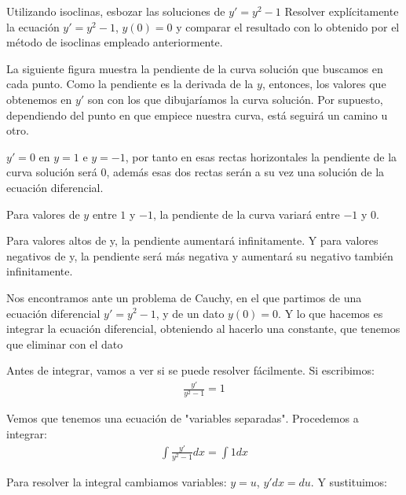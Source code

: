 \documentclass[nochap]{apuntes}
\begin{document}
\begin{problem}[4]
\ppart Utilizando isoclinas, esbozar las soluciones de $y'=y^2-1$
\ppart Resolver explícitamente la ecuación $y'=y^2-1$, $y(0)=0$ y comparar el resultado con lo obtenido por el método de isoclinas empleado anteriormente.

\solution



\spart
\begin{expla}
La siguiente figura muestra la pendiente de la curva solución que buscamos en cada punto. Como la pendiente es la derivada de la $y$, entonces, los valores que obtenemos en $y'$ son con los que dibujaríamos la curva solución. Por supuesto, dependiendo del punto en que empiece nuestra curva, está seguirá un camino u otro.

\end{expla}
$y'=0$ en $y=1$ e $y=-1$, por tanto en esas rectas horizontales la pendiente de la curva solución será 0, además esas dos rectas serán a su vez una solución de la ecuación diferencial.

Para valores de $y$ entre $1$ y $-1$, la pendiente de la curva variará entre $-1$ y $0$.

Para valores altos de y, la pendiente aumentará infinitamente. Y para valores negativos de y, la pendiente será más negativa y aumentará su negativo también infinitamente.


\newpage
\spart 
\begin{expla}
Nos encontramos ante un problema de Cauchy, en el que partimos de una ecuación diferencial $y'=y^2-1$, y de un dato $y(0)=0$. Y lo que hacemos es integrar la ecuación diferencial, obteniendo al hacerlo una constante, que tenemos que eliminar con el dato
\end{expla}
Antes de integrar, vamos a ver si se puede resolver fácilmente. Si escribimos:
\begin{gather*}
\frac{y'}{y^2-1}=1
\end{gather*}

Vemos que tenemos una ecuación de "variables separadas". Procedemos a integrar:
\begin{gather*}
\int\frac{y'}{y^2-1}dx=\int1dx
\end{gather*}

\begin{expla}
Para resolver la integral cambiamos variables: $y=u$, $y'dx=du$. Y sustituimos:


\end{expla}
\end{problem}
\end{document}
